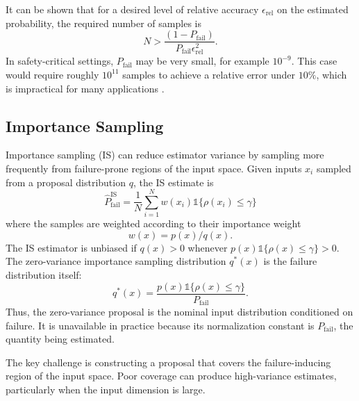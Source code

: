 \documentclass[twoside,11pt]{article}
\begin{document}
It can be shown that for a desired level of relative accuracy $\epsilon_{\text{rel}}$ on the estimated probability, the required number of samples is
\begin{equation*}
    N > \frac{(1 - P_{\text{fail}})}{ P_{\text{fail}} \epsilon^2_{\text{rel}}}.
\end{equation*}
In safety-critical settings, $P_{\text{fail}}$ may be very small, for example $10^{-9}$. This case would require roughly $10^{11}$ samples to achieve a relative error under $10\%$, which is impractical for many applications \citep{owen2013monte}.

\subsection{Importance Sampling}

Importance sampling (IS) can reduce estimator variance by sampling more frequently from failure-prone regions of the input space. Given inputs $x_i$ sampled from a proposal distribution $q$, the IS estimate is
\begin{equation}
    \label{eq:is-estimate}
    \hat{P}^\text{IS}_{\text{fail}}
    =
    \frac{1}{N}
    \sum_{i=1}^N
    w(x_i)
    \mathds{1}\{\rho(x_i)\leq\gamma\}
\end{equation}
where the samples are weighted according to their importance weight
\begin{equation*}
    w(x) = p(x)/q(x).
\end{equation*}
The IS estimator is unbiased if $q(x)>0$ whenever $p(x)\mathds{1}\{\rho(x)\leq\gamma\}>0$. The zero-variance importance sampling distribution $q^*(x)$ is the failure distribution itself:
\begin{equation*}
    q^*(x)=\frac{p(x)\mathds{1}\{\rho(x)\leq\gamma\}}{P_{\text{fail}}}.
\end{equation*}
Thus, the zero-variance proposal is the nominal input distribution conditioned on failure. It is unavailable in practice because its normalization constant is $P_{\text{fail}}$, the quantity being estimated.

The key challenge is constructing a proposal that covers the failure-inducing region of the input space. Poor coverage can produce high-variance estimates, particularly when the input dimension is large.

\end{document}
